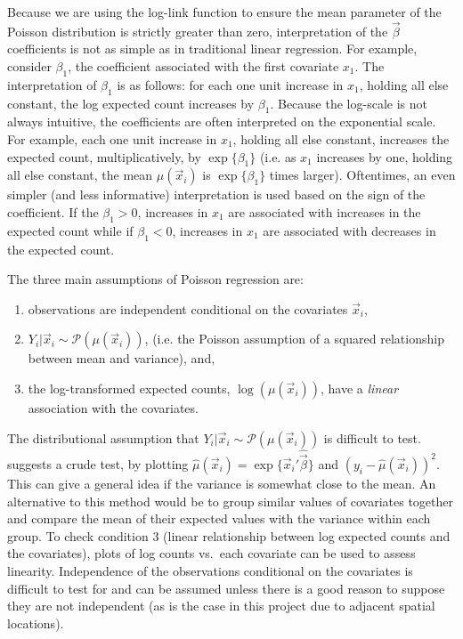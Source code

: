 Because we are using the log-link function to ensure the mean parameter of the Poisson distribution is {strictly} greater than zero, interpretation of the $\vec{\beta}$ coefficients is not as simple as in traditional linear regression. For example, consider $\beta_1$, the coefficient associated with the first covariate $x_{1}$.  The interpretation of $\beta_1$ is as follows:  for each one unit increase in $x_1$, holding all else constant, the log expected count increases by $\beta_1$. Because the log-scale is not always intuitive, the coefficients are often interpreted on the exponential scale.  For example, each one unit increase in $x_1$, holding all else constant, increases the expected count, multiplicatively, by $\exp\{\beta_1\}$ (i.e. as $x_1$ increases by one, holding all else constant, the mean $\mu(\vec{x}_i)$ is $\exp\{\beta_1\}$ times larger). Oftentimes, an even simpler (and less informative) interpretation is used based on the sign of the coefficient. If the $\beta_1>0$, increases in $x_1$ are associated with  increases in the expected count while if  $\beta_1 < 0$, increases in $x_1$ are associated with decreases in the expected count.

The three main assumptions of Poisson regression are:
\begin{enumerate}
\item observations are independent conditional on the covariates $\vec{x}_i$,
\item  $Y_i | \vec{x}_i \sim \mathcal{P}(\mu(\vec{x}_i))$, (i.e. the Poisson assumption of a squared relationship between mean and variance), and,
\item the log-transformed expected counts, $\log(\mu(\vec{x}_i))$, have a \textit{linear} association with the covariates.
\end{enumerate}
The distributional assumption that $Y_i | \vec{x}_i \sim \mathcal{P}(\mu(\vec{x}_i))$ is difficult to test. \citet{faraway06} suggests a crude test, by plotting $\hat{\mu}(\vec{x}_i) = \exp\{\vec{x}_i'\hat{\vec{\beta}}\}$ and $(y_i-\hat{\mu}(\vec{x}_i))^2$. This can give a general idea if the variance is somewhat close to the mean. An alternative to this method would be to group similar values of covariates together and compare the mean of their expected values with the variance within each group.  To check condition 3 (linear relationship between log expected counts and the covariates), plots of log counts vs.\ each covariate can be used to assess linearity. Independence of the observations conditional on the covariates is difficult to test for and can be assumed unless there is a good reason to suppose they are not independent (as is the case in this project due to adjacent spatial locations).

